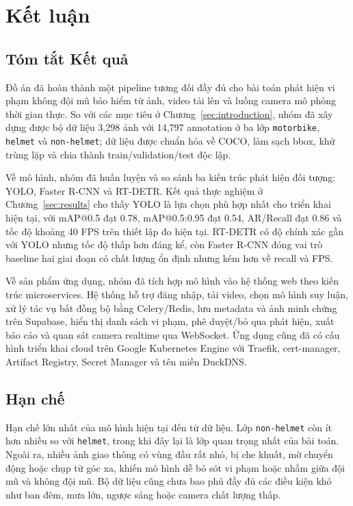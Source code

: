 \section{Kết luận}
\label{sec:conclusion}

\subsection{Tóm tắt Kết quả}

Đồ án đã hoàn thành một pipeline tương đối đầy đủ cho bài toán phát hiện vi phạm không đội mũ bảo hiểm từ ảnh, video tải lên và luồng camera mô phỏng thời gian thực. So với các mục tiêu ở Chương~\ref{sec:introduction}, nhóm đã xây dựng được bộ dữ liệu 3,298 ảnh với 14,797 annotation ở ba lớp \texttt{motorbike}, \texttt{helmet} và \texttt{non-helmet}; dữ liệu được chuẩn hóa về COCO, làm sạch bbox, khử trùng lặp và chia thành train/validation/test độc lập.

Về mô hình, nhóm đã huấn luyện và so sánh ba kiến trúc phát hiện đối tượng: YOLO, Faster R-CNN và RT-DETR. Kết quả thực nghiệm ở Chương~\ref{sec:results} cho thấy YOLO là lựa chọn phù hợp nhất cho triển khai hiện tại, với mAP@0.5 đạt 0.78, mAP@0.5:0.95 đạt 0.54, AR/Recall đạt 0.86 và tốc độ khoảng 40 FPS trên thiết lập đo hiện tại. RT-DETR có độ chính xác gần với YOLO nhưng tốc độ thấp hơn đáng kể, còn Faster R-CNN đóng vai trò baseline hai giai đoạn có chất lượng ổn định nhưng kém hơn về recall và FPS.

Về sản phẩm ứng dụng, nhóm đã tích hợp mô hình vào hệ thống web theo kiến trúc microservices. Hệ thống hỗ trợ đăng nhập, tải video, chọn mô hình suy luận, xử lý tác vụ bất đồng bộ bằng Celery/Redis, lưu metadata và ảnh minh chứng trên Supabase, hiển thị danh sách vi phạm, phê duyệt/bỏ qua phát hiện, xuất báo cáo và quan sát camera realtime qua WebSocket. Ứng dụng cũng đã có cấu hình triển khai cloud trên Google Kubernetes Engine với Traefik, cert-manager, Artifact Registry, Secret Manager và tên miền DuckDNS.

\subsection{Hạn chế}

Hạn chế lớn nhất của mô hình hiện tại đến từ dữ liệu. Lớp \texttt{non-helmet} còn ít hơn nhiều so với \texttt{helmet}, trong khi đây lại là lớp quan trọng nhất của bài toán. Ngoài ra, nhiều ảnh giao thông có vùng đầu rất nhỏ, bị che khuất, mờ chuyển động hoặc chụp từ góc xa, khiến mô hình dễ bỏ sót vi phạm hoặc nhầm giữa đội mũ và không đội mũ. Bộ dữ liệu cũng chưa bao phủ đầy đủ các điều kiện khó như ban đêm, mưa lớn, ngược sáng hoặc camera chất lượng thấp.

